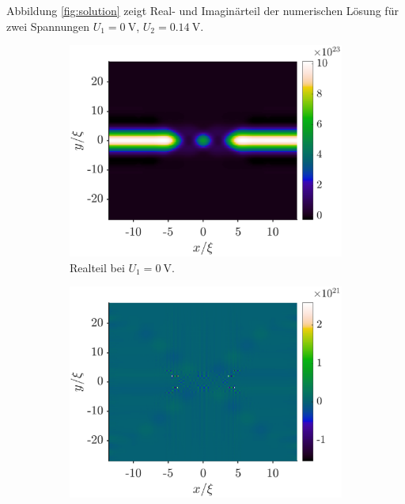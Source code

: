 Abbildung \ref{fig:solution} zeigt Real- und Imaginärteil der numerischen Lösung für zwei Spannungen $U_1=\SI{0}{\volt}$, $U_2=\SI{0.14}{\volt}$.
\begin{figure}
    \centering
    \begin{subfigure}[b]{0.48\textwidth}
        \centering
        \includegraphics[width=\textwidth]{plots/section2/real_0.00V_Kx30_Nx4_Ky150_flat.eps}
        \caption[]%
        {{\small Realteil bei $U_1=\SI{0}{\volt}$.}}
    \end{subfigure}
    \hfill
    \begin{subfigure}[b]{0.48\textwidth}
        \centering
        \includegraphics[width=\textwidth]{plots/section2/imag_0.00V_Kx30_Nx4_Ky150_flat.eps}

\end{subfigure}
\end{figure}
